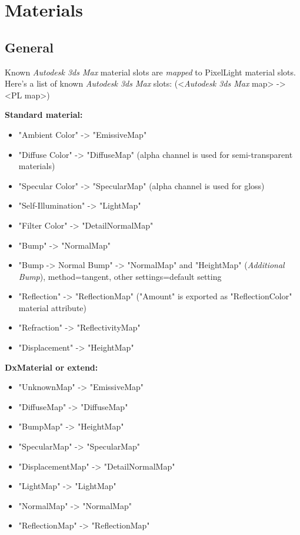 \chapter{Materials}




\section{General}
Known \emph{Autodesk 3ds Max} material slots are \emph{mapped} to PixelLight material slots. Here's a list of known \emph{Autodesk 3ds Max} slots: (<\emph{Autodesk 3ds Max} map> -> <PL map>)

\textbf{Standard material:}

\begin{itemize}
\item{"Ambient Color"       -> "EmissiveMap"}
\item{"Diffuse Color"       -> "DiffuseMap" (alpha channel is used for semi-transparent materials)}
\item{"Specular Color"      -> "SpecularMap" (alpha channel is used for gloss)}
\item{"Self-Illumination"   -> "LightMap"}
\item{"Filter Color"        -> "DetailNormalMap"}
\item{"Bump"                -> "NormalMap"}
\item{"Bump -> Normal Bump" -> "NormalMap" and "HeightMap" (\emph{Additional Bump}), method=tangent, other settings=default setting}
\item{"Reflection"          -> "ReflectionMap" ("Amount" is exported as "ReflectionColor" material attribute)}
\item{"Refraction"          -> "ReflectivityMap"}
\item{"Displacement"        -> "HeightMap"}
\end{itemize}

\textbf{DxMaterial or extend:}
\begin{itemize}
\item{"UnknownMap"        -> "EmissiveMap"}
\item{"DiffuseMap"        -> "DiffuseMap"}
\item{"BumpMap"           -> "HeightMap"}
\item{"SpecularMap"       -> "SpecularMap"}
\item{"DisplacementMap"   -> "DetailNormalMap"}
\item{"LightMap"          -> "LightMap"}
\item{"NormalMap"         -> "NormalMap"}
\item{"ReflectionMap"     -> "ReflectionMap"}
\end{itemize}

